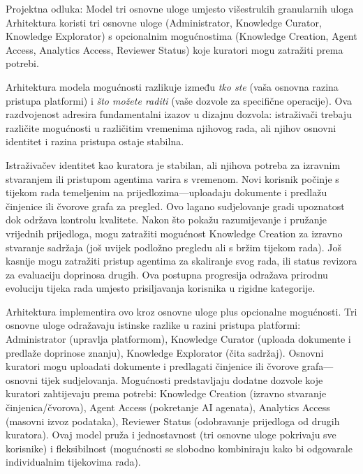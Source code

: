 \documentclass[12pt,a4paper]{article}
\begin{document}
\begin{rationale}{Projektna odluka: Model tri osnovne uloge umjesto višestrukih granularnih uloga}
Arhitektura koristi tri osnovne uloge (Administrator, Knowledge Curator, Knowledge Explorator) s opcionalnim mogućnostima (Knowledge Creation, Agent Access, Analytics Access, Reviewer Status) koje kuratori mogu zatražiti prema potrebi.
\end{rationale}

Arhitektura modela mogućnosti razlikuje između \textit{tko ste} (vaša osnovna razina pristupa platformi) i \textit{što možete raditi} (vaše dozvole za specifične operacije). Ova razdvojenost adresira fundamentalni izazov u dizajnu dozvola: istraživači trebaju različite mogućnosti u različitim vremenima njihovog rada, ali njihov osnovni identitet i razina pristupa ostaje stabilna.

Istraživačev identitet kao kuratora je stabilan, ali njihova potreba za izravnim stvaranjem ili pristupom agentima varira s vremenom. Novi korisnik počinje s tijekom rada temeljenim na prijedlozima—uploadaju dokumente i predlažu činjenice ili čvorove grafa za pregled. Ovo lagano sudjelovanje gradi upoznatost dok održava kontrolu kvalitete. Nakon što pokažu razumijevanje i pružanje vrijednih prijedloga, mogu zatražiti mogućnost Knowledge Creation za izravno stvaranje sadržaja (još uvijek podložno pregledu ali s bržim tijekom rada). Još kasnije mogu zatražiti pristup agentima za skaliranje svog rada, ili status revizora za evaluaciju doprinosa drugih. Ova postupna progresija odražava prirodnu evoluciju tijeka rada umjesto prisiljavanja korisnika u rigidne kategorije.

Arhitektura implementira ovo kroz osnovne uloge plus opcionalne mogućnosti. Tri osnovne uloge odražavaju istinske razlike u razini pristupa platformi: Administrator (upravlja platformom), Knowledge Curator (uploada dokumente i predlaže doprinose znanju), Knowledge Explorator (čita sadržaj). Osnovni kuratori mogu uploadati dokumente i predlagati činjenice ili čvorove grafa—osnovni tijek sudjelovanja. Mogućnosti predstavljaju dodatne dozvole koje kuratori zahtijevaju prema potrebi: Knowledge Creation (izravno stvaranje činjenica/čvorova), Agent Access (pokretanje AI agenata), Analytics Access (masovni izvoz podataka), Reviewer Status (odobravanje prijedloga od drugih kuratora). Ovaj model pruža i jednostavnost (tri osnovne uloge pokrivaju sve korisnike) i fleksibilnost (mogućnosti se slobodno kombiniraju kako bi odgovarale individualnim tijekovima rada).
\end{document}
